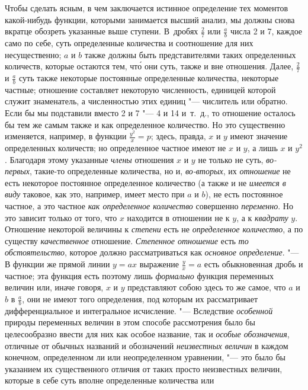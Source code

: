Чтобы сделать ясным, в чем заключается истинное определение тех моментов
какой-нибудь функции, которыми занимается высший анализ, мы должны снова
вкратце обозреть указанные выше ступени. В~дробях $\frac 2 7$ или
$\frac a b$ числа 2 и 7, каждое само по себе, суть определенные
количества и соотношение для них несущественно; $a$ и
$b$ также должны быть представителями таких
определенных количеств, которые остаются тем, чт\'{о} они суть, также и вне
отношения. Далее, $\frac 2 7$ и $\frac a b$ суть также некоторые
постоянные определенные количества, некоторые частные; отношение составляет
некоторую численность, единицей которой служит знаменатель, а численностью
этих единиц "--- числитель или обратно. Если бы мы подставили вместо 2 и 7
"--- 4 и 14 и~т.~д., то отношение осталось бы тем же самым также и как
определенное количество. Но это существенно изменяется, например, в функции
$\frac{y^2} x=p$; здесь, правда, $x$ и
$y$ имеют значение определенных количеств; но
определенное частное имеют не $x$ и
$y$, а лишь $x$ и
$y^{2}$. Благодаря этому указанные
{\em члены} отношения $x$ и
$y$ не только не суть,
{\em во-первых}, такие-то определенные количества, но
и, {\em во-вторых}, их
{\em отношение} не есть некоторое постоянное
определенное количество (а также и не {\em имеется в
виду} таковое, как это, например, имеет место при
$a$ и $b$), не есть
постоянное частное, а это частное {\em как определенное
количество} совершенно {\em переменно}. Но это зависит
только от того, что $x$ находится в отношении не к
$y$, а к {\em квадрату}
$y$. Отношение некоторой величины к
{\em степени} есть не
{\em определенное количество}, а по существу
{\em качественное} отношение.
{\em Степенное отношение} есть
{\em то обстоятельство}, которое должно рассматриваться
как {\em основное определение}. "--- В функции же прямой
линии $y=ax$ выражение $\frac y x=a$ есть обыкновенная дробь и
частное; эта функция есть поэтому лишь {\em формально}
функция переменных величин или, иначе говоря, $x$ и
$y$ представляют собою здесь то же самое, что $a$ и $b$ в
$\frac a b$, они не имеют того определения, под которым их рассматривает
дифференциальное и интегральное исчисление. "--- Вследствие
{\em особенной} природы переменных величин в этом
способе рассмотрения было бы целесообразно ввести для них как особое
название, так и {\em особые обозначения}, отличные от
обычных названий и обозначений {\em неизвестных
величин} в каждом конечном, определенном ли или неопределенном уравнении, "---
это было бы указанием их существенного отличия от таких просто неизвестных
величин, которые в себе суть вполне определенные количества или
